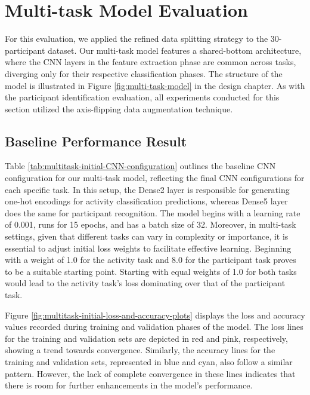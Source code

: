 \documentclass{l4proj}
\begin{document}
\section{Multi-task Model Evaluation}
For this evaluation, we applied the refined data splitting strategy to the 30-participant dataset. Our multi-task model features a shared-bottom architecture, where the CNN layers in the feature extraction phase are common across tasks, diverging only for their respective classification phases. The structure of the model is illustrated in Figure \ref{fig:multi-task-model} in the design chapter. As with the participant identification evaluation, all experiments conducted for this section utilized the axis-flipping data augmentation technique.

\subsection{Baseline Performance Result}
Table \ref{tab:multitask-initial-CNN-configuration} outlines the baseline CNN configuration for our multi-task model, reflecting the final CNN configurations for each specific task. In this setup, the Dense2 layer is responsible for generating one-hot encodings for activity classification predictions, whereas Dense5 layer does the same for participant recognition. The model begins with a learning rate of 0.001, runs for 15 epochs, and has a batch size of 32. Moreover, in multi-task settings, given that different tasks can vary in complexity or importance, it is essential to adjust initial loss weights to facilitate effective learning. Beginning with a weight of 1.0 for the activity task and 8.0 for the participant task proves to be a suitable starting point. Starting with equal weights of 1.0 for both tasks would lead to the activity task's loss dominating over that of the participant task.

Figure \ref{fig:multitask-initial-loss-and-accuracy-plots} displays the loss and accuracy values recorded during training and validation phases of the model. The loss lines for the training and validation sets are depicted in red and pink, respectively, showing a trend towards convergence. Similarly, the accuracy lines for the training and validation sets, represented in blue and cyan, also follow a similar pattern. However, the lack of complete convergence in these lines indicates that there is room for further enhancements in the model's performance.
\end{document}
